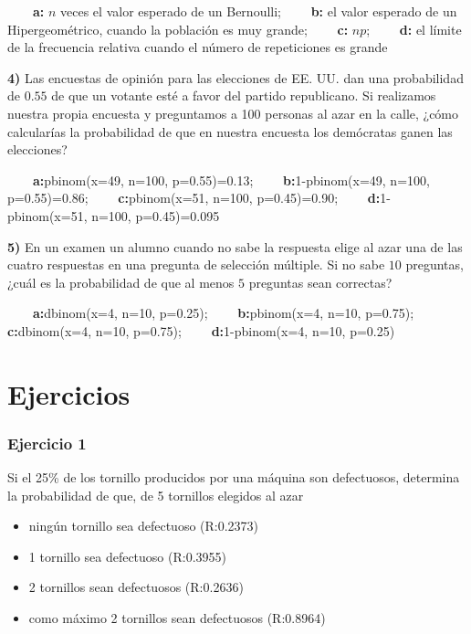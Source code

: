 \documentclass[
]{book}
\providecommand{\tightlist}{%
  \setlength{\itemsep}{0pt}\setlength{\parskip}{0pt}}
\begin{document}
\textbf{\(\qquad\)a:} \(n\) veces el valor esperado de un Bernoulli;
\textbf{\(\qquad\)b:} el valor esperado de un Hipergeométrico, cuando la población es muy grande;
\textbf{\(\qquad\)c:} \(np\);
\textbf{\(\qquad\)d:} el límite de la frecuencia relativa cuando el número de repeticiones es grande

\textbf{4)} Las encuestas de opinión para las elecciones de EE. UU. dan una probabilidad de \(0.55\) de que un votante esté a favor del partido republicano. Si realizamos nuestra propia encuesta y preguntamos a 100 personas al azar en la calle, ¿cómo calcularías la probabilidad de que en nuestra encuesta los demócratas ganen las elecciones?

\textbf{\(\qquad\)a:}pbinom(x=49, n=100, p=0.55)=0.13;
\textbf{\(\qquad\)b:}1-pbinom(x=49, n=100, p=0.55)=0.86;
\textbf{\(\qquad\)c:}pbinom(x=51, n=100, p=0.45)=0.90; \textbf{\(\qquad\)d:}1-pbinom(x=51, n=100, p=0.45)=0.095

\textbf{5)} En un examen un alumno cuando no sabe la respuesta elige al azar una de las cuatro respuestas en una pregunta de selección múltiple. Si no sabe \(10\) preguntas, ¿cuál es la probabilidad de que al menos \(5\) preguntas sean correctas?

\textbf{\(\qquad\)a:}dbinom(x=4, n=10, p=0.25); \textbf{\(\qquad\)b:}pbinom(x=4, n=10, p=0.75); \textbf{\(\qquad\)c:}dbinom(x=4, n=10, p=0.75); \textbf{\(\qquad\)d:}1-pbinom(x=4, n=10, p=0.25)

\hypertarget{ejercicios-5}{%
\section{Ejercicios}\label{ejercicios-5}}

\hypertarget{ejercicio-1-4}{%
\subsubsection{Ejercicio 1}\label{ejercicio-1-4}}

Si el 25\% de los tornillo producidos por una máquina son defectuosos, determina la probabilidad de que, de
5 tornillos elegidos al azar

\begin{itemize}
\tightlist
\item
  ningún tornillo sea defectuoso (R:0.2373)
\item
  1 tornillo sea defectuoso (R:0.3955)
\item
  2 tornillos sean defectuosos (R:0.2636)
\item
  como máximo 2 tornillos sean defectuosos (R:0.8964)
\end{itemize}
\end{document}
